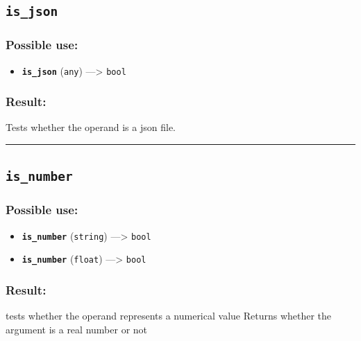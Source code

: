 \documentclass[]{book}
\providecommand{\tightlist}{%
  \setlength{\itemsep}{0pt}\setlength{\parskip}{0pt}}
\theoremstyle{definition}
\theoremstyle{definition}
\theoremstyle{definition}
\theoremstyle{remark}
\begin{document}
\subsection{\texorpdfstring{\texttt{is\_json}}{is\_json}}\label{is_json}

\subsubsection{Possible use:}\label{possible-use-295}

\begin{itemize}
\tightlist
\item
  \textbf{\texttt{is\_json}} (\texttt{any}) ---\textgreater{}
  \texttt{bool}
\end{itemize}

\subsubsection{Result:}\label{result-285}

Tests whether the operand is a json file.

\begin{center}\rule{0.5\linewidth}{\linethickness}\end{center}

\subsection{\texorpdfstring{\texttt{is\_number}}{is\_number}}\label{is_number}

\subsubsection{Possible use:}\label{possible-use-296}

\begin{itemize}
\tightlist
\item
  \textbf{\texttt{is\_number}} (\texttt{string}) ---\textgreater{}
  \texttt{bool}
\item
  \textbf{\texttt{is\_number}} (\texttt{float}) ---\textgreater{}
  \texttt{bool}
\end{itemize}

\subsubsection{Result:}\label{result-286}

tests whether the operand represents a numerical value Returns whether
the argument is a real number or not
\end{document}
